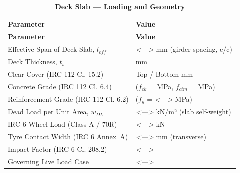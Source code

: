 \documentclass[12pt,a4paper]{report}
\numberwithin{table}{chapter}
\numberwithin{figure}{chapter}
\newcommand{\ReportTableGap}{\vspace{1em}}
\newcommand{\placeholder}[1]{\textit{\textless #1\textgreater}}
\begin{document}
\ReportTableGap
\begin{longtable}{|L{5.5cm}|p{10.0cm}|}
\caption{\textbf{Deck Slab --- Loading and Geometry}}\\
\hline
\textbf{Parameter} & \textbf{Value} \\
\hline
\endfirsthead
\hline
\textbf{Parameter} & \textbf{Value} \\
\hline
\endhead

\textnormal{Effective Span of Deck Slab, $l_{eff}$} & \placeholder{---} mm (girder spacing, c/c) \\[6pt]
\hline
\textnormal{Deck Thickness, $t_s$} &  mm \\[6pt]
\hline
\textnormal{Clear Cover (IRC 112 Cl. 15.2)} & Top  / Bottom  mm \\[6pt]
\hline
\textnormal{Concrete Grade (IRC 112 Cl. 6.4)} &  ($f_{ck}$ =  MPa, $f_{ctm}$ =  MPa) \\[6pt]
\hline
\textnormal{Reinforcement Grade (IRC 112 Cl. 6.2)} &  ($f_y$ = \placeholder{---} MPa) \\[6pt]
\hline
\textnormal{Dead Load per Unit Area, $w_{DL}$} & \placeholder{---} kN/m² (slab self-weight) \\[6pt]
\hline
\textnormal{IRC 6 Wheel Load (Class A / 70R)} & \placeholder{---} kN \\[6pt]
\hline
\textnormal{Tyre Contact Width (IRC 6 Annex~A)} & \placeholder{---} mm (transverse) \\[6pt]
\hline
\textnormal{Impact Factor (IRC 6 Cl. 208.2)} & \placeholder{---} \\[6pt]
\hline
\textnormal{Governing Live Load Case} & \placeholder{---} \\[6pt]
\hline
\end{longtable}
\end{document}
